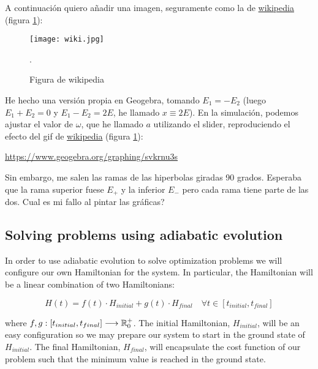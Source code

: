 A continuación quiero añadir una imagen, seguramente como la de \href{https://en.wikipedia.org/wiki/Avoided_crossing}{wikipedia} (figura \ref{temp}):

\begin{figure}[H]
	\texttt{[image: wiki.jpg]}
	\centering
	\caption{Figura de wikipedia}.
	\label{temp}
\end{figure}

He hecho una versión propia en Geogebra, tomando $E_1 = -E_2$ (luego $E_1 + E_2 = 0$ y $E_1 - E_2 = 2E$, he llamado $x \equiv 2E$). En la simulación, podemos ajustar el valor de $\omega$, que he llamado $a$ utilizando el slider, reproduciendo el efecto del gif de \href{https://en.wikipedia.org/wiki/Avoided_crossing}{wikipedia} (figura \ref{temp}):

\href{https://www.geogebra.org/graphing/svkrnu3s}{https://www.geogebra.org/graphing/svkrnu3s}

Sin embargo, me salen las ramas de las hiperbolas giradas 90 grados. Esperaba que la rama superior fuese $E_+$ y la inferior $E_-$ pero cada rama tiene parte de las dos. Cual es mi fallo al pintar las gráficas?






\subsection{Solving problems using adiabatic evolution}


In order to use adiabatic evolution to solve optimization problems we will configure our own Hamiltonian for the system. In particular, the Hamiltonian will be a linear combination of two Hamiltonians:

$$ H(t) = f(t) \cdot H_{initial} + g(t) \cdot H_{final} \quad \forall t \in [t_{initial}, t_{final}] $$

where $f,g: [t_{initial}, t_{final}] \longrightarrow \mathbb{R}^+_0$. The initial Hamiltonian, $H_{initial}$, will be an easy configuration so we may prepare our system to start in the ground state of $H_{initial}$. The final Hamiltonian, $H_{final}$, will encapsulate the cost function of our problem such that the minimum value is reached in the ground state. 

